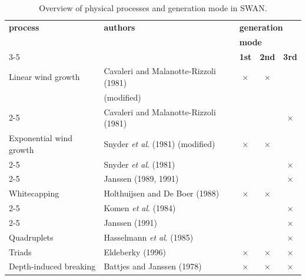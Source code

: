 \documentclass[12pt]{book}
\begin{document}
\begin{table}[htb]
\begin{center}
\caption{Overview of physical processes and generation mode in SWAN.}
\label{tab:ovmod}
\begin{tabular}{|l | l | c | c | c|}
\hline
  \multicolumn{1}{|l|}{{\bf process}}&
  \multicolumn{1}{|l|}{{\bf authors}}&
  \multicolumn{3}{|l|}{{\bf generation}}\\
  \multicolumn{1}{|l|}{}&
  \multicolumn{1}{|l|}{}&
  \multicolumn{3}{|l|}{{\bf mode}}\\
\cline{3-5}
  \multicolumn{1}{|l|}{}&
  \multicolumn{1}{|l|}{}&
  \multicolumn{1}{|c|}{{\bf 1st}}&
  \multicolumn{1}{|c|}{{\bf 2nd}}&
  \multicolumn{1}{|c|}{{\bf 3rd}}\\
\hline
\hline
Linear wind growth      & Cavaleri and Malanotte-Rizzoli (1981)  & $\times$ & $\times$ &          \\
                        & (modified)                             &          &          &          \\
\cline{2-5}
                        & Cavaleri and Malanotte-Rizzoli (1981)  &          &          & $\times$ \\
\hline
Exponential wind growth & Snyder {\it et al}. (1981) (modified)  & $\times$ & $\times$ &          \\
\cline{2-5}
                        & Snyder {\it et al}. (1981)             &          &          & $\times$ \\
\cline{2-5}
                        & Janssen (1989, 1991)                   &          &          & $\times$ \\
\hline
Whitecapping            & Holthuijsen and De Boer (1988)         & $\times$ & $\times$ &          \\
\cline{2-5}
                        & Komen {\it et al}. (1984)              &          &          & $\times$ \\
\cline{2-5}
                        & Janssen (1991)                         &          &          & $\times$ \\
\hline
Quadruplets             & Hasselmann {\it et al}. (1985)         &          &          & $\times$ \\
\hline
\hline
Triads                  & Eldeberky (1996)                       & $\times$ & $\times$ & $\times$ \\
\hline
Depth-induced breaking  & Battjes and Janssen (1978)             & $\times$ & $\times$ & $\times$ \\
\hline

\end{tabular}
\end{center}
\end{table}
\end{document}
